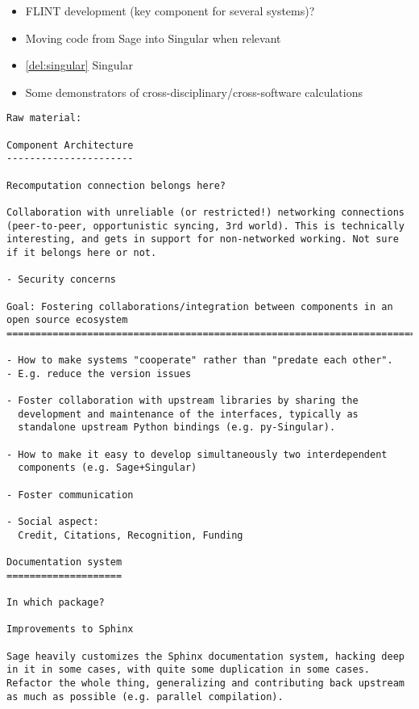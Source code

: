 \begin{Workpackage}{\thewpno}
\begin{WPDeliverables}
\begin{itemize}
\item FLINT development (key component for several systems)?

\item Moving code from Sage into Singular when relevant
\item \ref{del:singular} Singular
\item Some demonstrators of cross-disciplinary/cross-software calculations


\end{itemize}
\end{WPDeliverables}
\begin{verbatim}
Raw material:

Component Architecture
----------------------

Recomputation connection belongs here?

Collaboration with unreliable (or restricted!) networking connections
(peer-to-peer, opportunistic syncing, 3rd world). This is technically
interesting, and gets in support for non-networked working. Not sure
if it belongs here or not.

- Security concerns

Goal: Fostering collaborations/integration between components in an open source ecosystem
=============================================================================

- How to make systems "cooperate" rather than "predate each other".
- E.g. reduce the version issues

- Foster collaboration with upstream libraries by sharing the
  development and maintenance of the interfaces, typically as
  standalone upstream Python bindings (e.g. py-Singular).

- How to make it easy to develop simultaneously two interdependent
  components (e.g. Sage+Singular)

- Foster communication

- Social aspect:
  Credit, Citations, Recognition, Funding

Documentation system
====================

In which package?

Improvements to Sphinx

Sage heavily customizes the Sphinx documentation system, hacking deep
in it in some cases, with quite some duplication in some cases.
Refactor the whole thing, generalizing and contributing back upstream
as much as possible (e.g. parallel compilation).
\end{verbatim}

\end{Workpackage}

